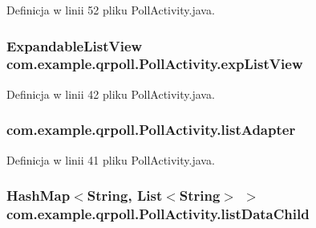 Definicja w linii 52 pliku Poll\+Activity.\+java.

\hypertarget{classcom_1_1example_1_1qrpoll_1_1_poll_activity_a45d9887fce62772f80726024d1775f7d}{
\subsubsection[{exp\+List\+View}]{\setlength{\rightskip}{0pt plus 5cm}Expandable\+List\+View com.\+example.\+qrpoll.\+Poll\+Activity.\+exp\+List\+View\hspace{0.3cm}{\ttfamily [package]}}}\label{classcom_1_1example_1_1qrpoll_1_1_poll_activity_a45d9887fce62772f80726024d1775f7d}


Definicja w linii 42 pliku Poll\+Activity.\+java.

\hypertarget{classcom_1_1example_1_1qrpoll_1_1_poll_activity_aeedb4d35f1bb56db80b834a5c5da4f44}{
\subsubsection[{list\+Adapter}]{ com.\+example.\+qrpoll.\+Poll\+Activity.\+list\+Adapter\hspace{0.3cm}{\ttfamily [package]}}}\label{classcom_1_1example_1_1qrpoll_1_1_poll_activity_aeedb4d35f1bb56db80b834a5c5da4f44}


Definicja w linii 41 pliku Poll\+Activity.\+java.

\hypertarget{classcom_1_1example_1_1qrpoll_1_1_poll_activity_ab607bec81e729232d72cee9db8ffdc73}{
\subsubsection[{list\+Data\+Child}]{\setlength{\rightskip}{0pt plus 5cm}Hash\+Map$<$String, List$<$String$>$ $>$ com.\+example.\+qrpoll.\+Poll\+Activity.\+list\+Data\+Child\hspace{0.3cm}{\ttfamily [package]}}}\label{classcom_1_1example_1_1qrpoll_1_1_poll_activity_ab607bec81e729232d72cee9db8ffdc73}


